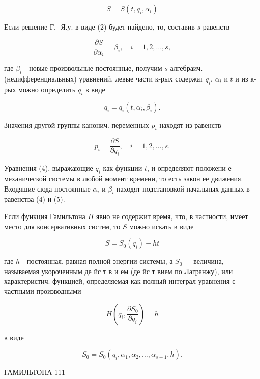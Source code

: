 \documentclass[10pt]{article}
\begin{document}
\[

S=S\left(t, q_{i}, \alpha_{i}\right)

\]



Если решение Г.- Я.у. в виде (2) будет найдено, то, составив $s$ равенств



\[

\frac{\partial S}{\partial \alpha_{i}}=\beta_{i}, \quad i=1,2, \ldots, s,

\]



где $\beta_{i}$ - новые произвольные постоянные, получим $s$ алгебраич. (недифференциальных) уравнений, левые части к-рых содержат $q_{i}$, $\alpha_{i}$ и $t$ и из к-рых можно определить $q_{i}$ в виде



\[

q_{i}=q_{i}\left(t, \alpha_{i}, \beta_{i}\right) .

\]



Значения другой группы канонич. переменных $p_{i}$ находят из равенств



\[

p_{i}=\frac{\partial S}{\partial q_{i}}, \quad i=1,2, \ldots, s .

\]



Уравнения (4), выражающие $q_{i}$ как функции $t$, и определяют положени е механической системы в любой момент времени, то есть закон ее движения. Входяшие сюда постоянные $\alpha_{i}$ и $\beta_{i}$ находят подстановкой начальных данных в равенства (4) и (5).



Если функция Гамильтона $H$ явно не содержит время, что, в частности, имеет место для консервативных систем, то $S$ можно искать в виде



\[

S=S_{0}\left(q_{i}\right)-h t

\]



где $h$ - постоянная, равная полной энергии системы, а $S_{0}-$ величина, называемая укороченным де йс т в и ем (де йс т вием по Лагранжу), или характеристич. функцией, определяемая как полный интеграл уравнения с частными производными



\[

H\left(q_{i}, \frac{\partial S_{0}}{\partial q_{i}}\right)=h

\]



в виде



\[

S_{0}=S_{0}\left(q_{i}, \alpha_{1}, \alpha_{2}, \ldots, \alpha_{s-1}, h\right) .

\]



ГАМИЛЬТОНА 111
\end{document}

